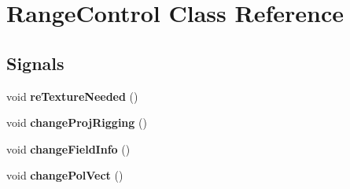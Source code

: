 \hypertarget{classRangeControl}{
\section{RangeControl Class Reference}
\label{classRangeControl}
}
\subsection*{Signals}
\begin{DoxyCompactItemize}
\item 
\hypertarget{classRangeControl_a371e1d2b8a7fad6588b67ea8c547b446}{
void {\bfseries reTextureNeeded} ()}
\label{classRangeControl_a371e1d2b8a7fad6588b67ea8c547b446}

\item 
\hypertarget{classRangeControl_a381f0a060fea2f8015ad91a424cd39bd}{
void {\bfseries changeProjRigging} ()}
\label{classRangeControl_a381f0a060fea2f8015ad91a424cd39bd}

\item 
\hypertarget{classRangeControl_ae11fb48660320da665f39d1da549b788}{
void {\bfseries changeFieldInfo} ()}
\label{classRangeControl_ae11fb48660320da665f39d1da549b788}

\item 
\hypertarget{classRangeControl_ac94aa08b460b1573780cebf4553fcbd4}{
void {\bfseries changePolVect} ()}
\label{classRangeControl_ac94aa08b460b1573780cebf4553fcbd4}

\end{DoxyCompactItemize}
